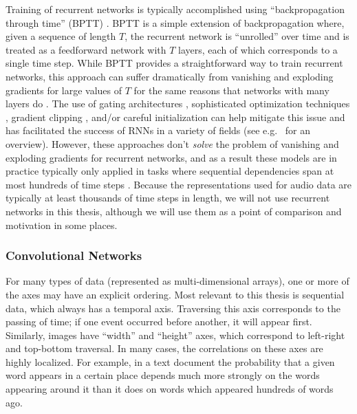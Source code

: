 Training of recurrent networks is typically accomplished using ``backpropagation through time'' (BPTT) \cite{}.
BPTT is a simple extension of backpropagation where, given a sequence of length $T$, the recurrent network is ``unrolled'' over time and is treated as a feedforward network with $T$ layers, each of which corresponds to a single time step.
While BPTT provides a straightforward way to train recurrent networks, this approach can suffer dramatically from vanishing and exploding gradients for large values of $T$ for the same reasons that networks with many layers do \cite{}.
The use of gating architectures \cite{hochreiter1997long,cho2014learning}, sophisticated optimization techniques \cite{martens2011learning,sutskever2013importance}, gradient clipping \cite{pascanu2012difficulty,graves2013generating}, and/or careful initialization \cite{sutskever2013importance,jaegar2012long,mikolov2014learning,le2015simple} can help mitigate this issue and has facilitated the success of RNNs in a variety of fields (see e.g.\ \cite{graves2012supervised} for an overview).
However, these approaches don't {\em solve} the problem of vanishing and exploding gradients for recurrent networks, and as a result these models are in practice typically only applied in tasks where sequential dependencies span at most hundreds of time steps \cite{martens2011learning,sutskever2013importance,le2015simple,hochreiter1997long,krueger2015regularizing,arjovsky2015unitary}.
Because the representations used for audio data are typically at least thousands of time steps in length, we will not use recurrent networks in this thesis, although we will use them as a point of comparison and motivation in some places.

\subsubsection{Convolutional Networks}

For many types of data (represented as multi-dimensional arrays), one or more of the axes may have an explicit ordering.
Most relevant to this thesis is sequential data, which always has a temporal axis.
Traversing this axis corresponds to the passing of time; if one event occurred before another, it will appear first.
Similarly, images have ``width'' and ``height'' axes, which correspond to left-right and top-bottom traversal.
In many cases, the correlations on these axes are highly localized.
For example, in a text document the probability that a given word appears in a certain place depends much more strongly on the words appearing around it than it does on words which appeared hundreds of words ago.


